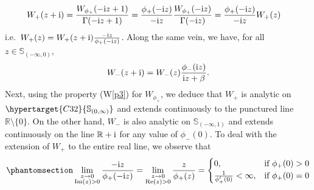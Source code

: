 \documentclass[12pt]{amsart}
\newcommand{\hlabel}{\phantomsection\label}
\newcommand{\hptg}[2]{\hypertarget{#1}{#2}}
\numberwithin{equation}{section}
\newcommand{\bb}{\mathbb}
\newcommand{\cc}{\mathcal}
\renewcommand{\Re}{\textrm{Re}}
\renewcommand{\Im}{\textrm{Im}}
\renewcommand{\i}{\mathrm{i}}
\theoremstyle{definition}
\theoremstyle{assump}
\theoremstyle{remark}
\begin{document}
\begin{align*}
W_+(z+{\rm i})&=\frac{W_{\phi_+}(-{\rm i}z+1)}{\Gamma(-{\rm i}z+1)}=\frac{\phi_+(-{\rm i}z)}{-{\rm i}z}\frac{W_{\phi_+}(-{\rm i}z)}{\Gamma(-{\rm i}z)}=\frac{\phi_+(-{\rm i}z)}{-{\rm i}z}W_+(z)
\end{align*}
i.e.~$W_+(z)=W_+(z+\i)\frac{-{\rm i}z}{\phi_+(-{\rm i}z)}$. Along the same vein, we have, for all $z\in\bb{S}_{(-\infty,0)}$,
\begin{align*}
W_-(z+\i)=W_-(z)\frac{\phi_-({\rm i}z)}{{\rm i}z+\beta}.
\end{align*}
 Next, using  the property (W\ref{p3}) for $W_{\phi_+}$, we deduce that $W_+$ is analytic on $\hptg{C32}{\bb{S}_{(0,\infty)}}$ and extends  continuously to the punctured line $\bb{R}\setminus\{0\}$. On the other hand, $W_-$ is also analytic on $\bb{S}_{(-\infty,1)}$ and extends continuously on the line $\bb R+{\rm{i}}$ for any value of $\phi_-(0)$. To deal with the extension of $W_+$ to the entire real line, we observe that
 \begin{align}\hlabel{eq:phi_derivative}
 	\lim_{\substack{z\to 0 \\ \Im(z)>0}}\frac{-{\rm i}z}{\phi_+(-{\rm i}z)}=\lim_{\substack{z\to 0 \\ \Re(z)>0}}\frac{z}{\phi_+(z)}=\begin{cases} 0, & \mbox{if $\phi_+(0)>0$} \\
 \frac{1}{\phi_+'(0)}<\infty, & \mbox{if $\phi_+(0)=0$}
 \end{cases}
 \end{align}
\end{document}
